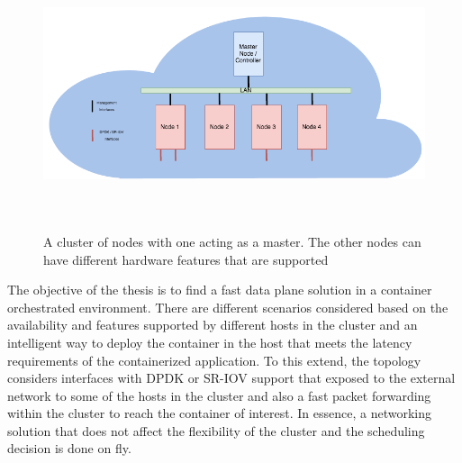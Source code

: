 \documentclass[english, 12pt, a4paper, elec, utf8, a-1b, online]{aaltothesis}
\begin{document}
\begin{figure}[htb]
\begin{center}
\includegraphics[height=8cm,width=15cm]{pics/ClusterDiag.png}
\end{center}
\caption{A cluster of nodes with one acting as a master. The other nodes can have different hardware features that are supported}
\label{liitekuva}
\end{figure}

The objective of the thesis is to find a fast data plane solution in a container orchestrated environment. There are different scenarios considered based on the availability and features supported by different hosts in the cluster and an intelligent way to deploy the container in the host that meets the latency requirements of the containerized application. To this extend, the topology considers interfaces with DPDK or SR-IOV support that exposed to the external network to some of the hosts in the cluster and also a fast packet forwarding within the cluster to reach the container of interest. In essence, a networking solution that does not affect the flexibility of the cluster and the scheduling decision is done on fly. 

\end{document}
